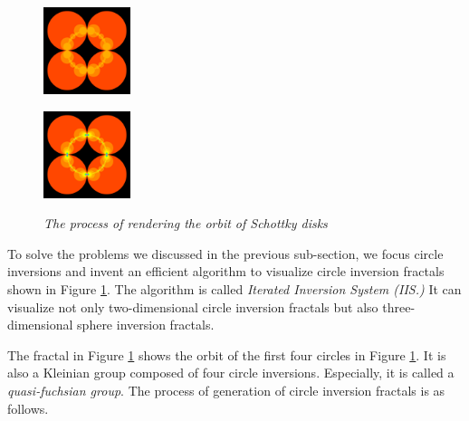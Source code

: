 \begin{figure}[htbp]
 \begin{minipage}[t]{0.16\hsize}
  \center
  \includegraphics[width=1in, height=1in, keepaspectratio]{./img/preparation/orbit/level2c.pdf}
  \subcaption{}
  \label{fig:level2}
 \end{minipage}
 \begin{minipage}[t]{0.16\hsize}
  \center
  \includegraphics[width=1in, height=1in, keepaspectratio]{img/preparation/orbit/levelMaxc.pdf}
  \subcaption{}
  \label{fig:levelMax}
 \end{minipage}
 \caption{\textit{The process of rendering the orbit of Schottky disks}}
 \label{fig:schottkyProcess}
\end{figure}

\noindent To solve the problems we discussed in the previous sub-section,
we focus circle inversions and invent an efficient algorithm to
visualize circle inversion fractals shown in Figure \ref{fig:schottkyProcess}.
The algorithm is called \textit{Iterated Inversion System (IIS.)}
It can visualize not only two-dimensional circle inversion fractals but
also three-dimensional sphere inversion fractals.

The fractal in Figure \ref{fig:schottkyProcess} shows the orbit of the first
four circles in Figure \ref{fig:schottkyProcess}. %
It is also a Kleinian group composed of four circle inversions.
Especially, it is called a \textit{quasi-fuchsian group}.
The process of generation of circle inversion fractals is
as follows.

